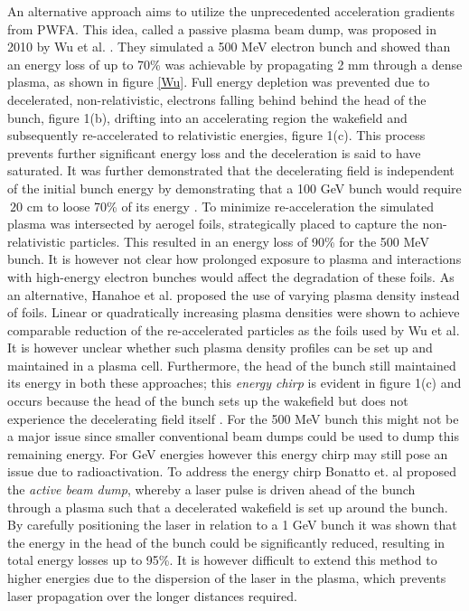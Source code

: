 \indent An alternative approach aims to utilize the unprecedented acceleration gradients from PWFA. This idea, called a passive plasma beam dump, was proposed in 2010 by Wu et al. \cite{Wu2010}. They simulated a 500 MeV electron bunch and showed than an energy loss of up to 70\% was achievable by propagating 2 mm through a dense plasma, as shown in figure \ref{Wu}. Full energy depletion was prevented due to decelerated, non-relativistic, electrons falling behind behind the head of the bunch, figure 1(b), drifting into an accelerating region the wakefield and subsequently re-accelerated to relativistic energies, figure 1(c). This process prevents further significant energy loss and the deceleration is said to have saturated. It was further demonstrated that the decelerating field is independent of the initial bunch energy by demonstrating that a 100 GeV bunch would require $~20$ cm to loose 70\% of its energy \cite{Wu2010}. To minimize re-acceleration the simulated plasma was intersected by aerogel foils, strategically placed to capture the non-relativistic particles. This resulted in an energy loss of 90\% for the 500 MeV bunch. It is however not clear how prolonged exposure to plasma and interactions with high-energy electron bunches would affect the degradation of these foils. As an alternative, Hanahoe et al. \cite{Hanahoe2017} proposed the use of varying plasma density instead of foils. Linear or quadratically increasing plasma densities were shown to achieve comparable reduction of the re-accelerated particles as the foils used by Wu et al. It is however unclear whether such plasma density profiles can be set up and maintained in a plasma cell. 
Furthermore, the head of the bunch still maintained its energy in both these approaches; this \textit{energy chirp} is evident in figure 1(c) and occurs because the head of the bunch sets up the wakefield but does not experience the decelerating field itself \cite{Wu2010}. For the 500 MeV bunch this might not be a major issue since smaller conventional beam dumps could be used to dump this remaining energy. For GeV energies however this energy chirp may still pose an issue due to radioactivation. To address the energy chirp Bonatto et. al \cite{Bonatto2015} proposed the \textit{active beam dump}, whereby a laser pulse is driven ahead of the bunch through a plasma such that a decelerated wakefield is set up around the bunch. 
By carefully positioning the laser in relation to a 1 GeV bunch it was shown that the energy in the head of the bunch could be significantly reduced, resulting in total energy losses up to 95\%. It is however difficult to extend this method to higher energies due to the dispersion of the laser in the plasma, which prevents laser propagation over the longer distances required. \\
